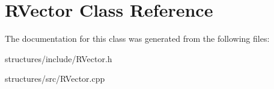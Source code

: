 \hypertarget{classRVector}{
\section{RVector Class Reference}
\label{classRVector}
}


The documentation for this class was generated from the following files:\begin{DoxyCompactItemize}
\item 
structures/include/RVector.h\item 
structures/src/RVector.cpp\end{DoxyCompactItemize}
